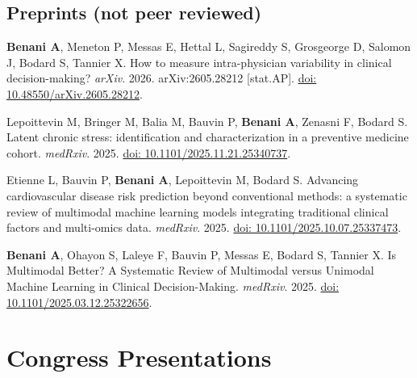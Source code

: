 \documentclass[10pt,letterpaper]{article}
\newcommand{\doi}[1]{\href{https://doi.org/#1}{doi: #1}}
\newcommand{\me}{\textbf{Benani A}}
\begin{document}
\subsection{Preprints (not peer reviewed)}
\begin{pubs}[resume]
\item \me, Meneton P, Messas E, Hettal L, Sagireddy S, Grosgeorge D, Salomon J, Bodard S, Tannier X. How to measure intra-physician variability in clinical decision-making? \textit{arXiv}. 2026. arXiv:2605.28212 [stat.AP]. \doi{10.48550/arXiv.2605.28212}.
\item Lepoittevin M, Bringer M, Balia M, Bauvin P, \me, Zenasni F, Bodard S. Latent chronic stress: identification and characterization in a preventive medicine cohort. \textit{medRxiv}. 2025. \doi{10.1101/2025.11.21.25340737}.
\item Etienne L, Bauvin P, \me, Lepoittevin M, Bodard S. Advancing cardiovascular disease risk prediction beyond conventional methods: a systematic review of multimodal machine learning models integrating traditional clinical factors and multi-omics data. \textit{medRxiv}. 2025. \doi{10.1101/2025.10.07.25337473}.
\item \me, Ohayon S, Laleye F, Bauvin P, Messas E, Bodard S, Tannier X. Is Multimodal Better? A Systematic Review of Multimodal versus Unimodal Machine Learning in Clinical Decision-Making. \textit{medRxiv}. 2025. \doi{10.1101/2025.03.12.25322656}.
\end{pubs}

\section{Congress Presentations}
\end{document}
